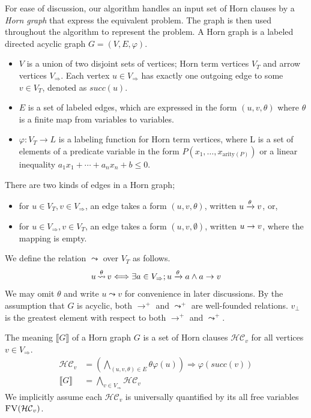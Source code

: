 For ease of discussion, our algorithm handles an input set of Horn
clauses by a \emph{Horn graph} that express the equivalent problem.
The graph is then used throughout the algorithm to represent the
problem.  A Horn graph is a labeled directed acyclic graph
$G=(V,E,\varphi)$.
\begin{itemize}
\item $V$ is a union of two disjoint sets of vertices; Horn term
  vertices $V_T$ and arrow vertices $V_\Rightarrow$.  Each vertex
  $u \in V_\Rightarrow$ has exactly one outgoing edge to some
  $v \in V_T$, denoted as $succ(u)$.
\item $E$ is a set of labeled edges, which are expressed in the form
  $(u,v,\theta)$ where $\theta$ is a finite map from variables to
  variables.
\item $\varphi: V_T \rightarrow L$ is a labeling function for Horn
  term vertices, where L is a set of elements of a predicate variable
  in the form $P(x_1, \ldots, x_{\mathrm{arity}(P)})$ or a linear
  inequality $a_1 x_1 + \cdots + a_n x_n + b \leq 0$.
\end{itemize}
There are two kinds of edges in a Horn graph;
\begin{itemize}
\item for $u \in V_T, v \in V_\Rightarrow$, an edge takes a form
  $(u,v,\theta)$, written $u\xrightarrow{\theta}v$, or,
\item for $u \in V_\Rightarrow, v \in V_T$, an edge takes a form
  $(u,v,\emptyset)$, written $u\rightarrow v$, where the mapping is
  empty.
\end{itemize}

We define the relation $\leadsto$ over $V_T$ as follows.
\[ u \mathop{\leadsto}^\theta v \Longleftrightarrow \exists a \in V_\Rightarrow;
u\xrightarrow{\theta}a \wedge a\rightarrow v \]
We may omit $\theta$ and write $u \leadsto v$ for convenience in later
discussions. By the assumption that $G$ is acyclic, both
$\rightarrow^+$ and $\leadsto^+$ are well-founded relations. $v_\bot$
is the greatest element with respect to both $\rightarrow^+$ and
$\leadsto^+$.

The meaning $\llbracket G \rrbracket $ of a Horn graph $G$ is a set of
Horn clauses $\mathcal{HC}_v$ for all vertices $v \in V_\Rightarrow$.
\begin{align*}
\mathcal{HC}_v & = \left( \bigwedge_{(u,v,\theta) \in E} \theta \varphi(u) \right) \Longrightarrow \varphi(succ(v)) \\
\llbracket G \rrbracket & = \bigwedge_{v \in V_\Rightarrow} \mathcal{HC}_v
\end{align*}
We implicitly assume each $\mathcal{HC}_v$ is universally quantified
by its all free variables $\textsc{FV}(\mathcal{HC}_v)$.

